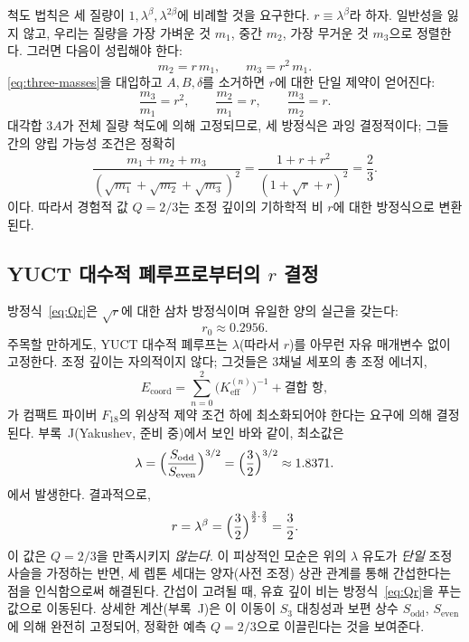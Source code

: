 \documentclass[11pt,a4paper]{article}
\theoremstyle{remark}
\begin{document}
	척도 법칙은 세 질량이 \(1, \lambda^{\beta}, \lambda^{2\beta}\)에 비례할 것을 요구한다. \(r \equiv \lambda^{\beta}\)라 하자. 일반성을 잃지 않고, 우리는 질량을 가장 가벼운 것 \(m_1\), 중간 \(m_2\), 가장 무거운 것 \(m_3\)으로 정렬한다. 그러면 다음이 성립해야 한다:
	\begin{equation}
		m_2 = r\, m_1, \qquad m_3 = r^2\, m_1 .
	\end{equation}
	\eqref{eq:three-masses}을 대입하고 \(A,B,\delta\)를 소거하면 \(r\)에 대한 단일 제약이 얻어진다:
	\begin{equation}
		\frac{m_3}{m_1} = r^2, \qquad
		\frac{m_2}{m_1} = r, \qquad
		\frac{m_3}{m_2} = r .
	\end{equation}
	대각합 \(3A\)가 전체 질량 척도에 의해 고정되므로, 세 방정식은 과잉 결정적이다; 그들 간의 양립 가능성 조건은 정확히
	\begin{equation}
		\frac{m_1 + m_2 + m_3}{(\sqrt{m_1}+\sqrt{m_2}+\sqrt{m_3})^2}
		= \frac{1 + r + r^2}{(1 + \sqrt{r} + r)^2} = \frac{2}{3}.
		\label{eq:Qr}
	\end{equation}
	이다. 따라서 경험적 값 \(Q=2/3\)는 조정 깊이의 기하학적 비 \(r\)에 대한 방정식으로 변환된다.
	
	\subsection{YUCT 대수적 폐루프로부터의 \(r\) 결정}
	
	방정식~\eqref{eq:Qr}은 \(\sqrt{r}\)에 대한 삼차 방정식이며 유일한 양의 실근을 갖는다:
	\begin{equation}
		r_0 \approx 0.2956 .
	\end{equation}
	주목할 만하게도, YUCT 대수적 폐루프는 \(\lambda\)(따라서 \(r\))를 아무런 자유 매개변수 없이 고정한다. 조정 깊이는 자의적이지 않다; 그것들은 3채널 세포의 총 조정 에너지,
	\begin{equation}
		E_{\mathrm{coord}} = \sum_{n=0}^{2} \bigl(K_{\mathrm{eff}}^{(n)}\bigr)^{-1}
		+ \text{결합 항},
	\end{equation}
	가 컴팩트 파이버 \(F_{18}\)의 위상적 제약 조건 하에 최소화되어야 한다는 요구에 의해 결정된다. 부록~J(Yakushev, 준비 중)에서 보인 바와 같이, 최소값은
	\begin{equation}
		\lambda = \Bigl(\frac{S_{\mathrm{odd}}}{S_{\mathrm{even}}}\Bigr)^{3/2}
		= \Bigl(\frac{3}{2}\Bigr)^{3/2} \approx 1.8371 .
	\end{equation}
	에서 발생한다. 결과적으로,
	\begin{equation}
		r = \lambda^{\beta} = \Bigl(\frac{3}{2}\Bigr)^{\frac{3}{2}\cdot\frac{2}{3}}
		= \frac{3}{2} .
	\end{equation}
	이 값은 \(Q=2/3\)을 만족시키지 \emph{않는다}. 이 피상적인 모순은 위의 \(\lambda\) 유도가 \emph{단일} 조정 사슬을 가정하는 반면, 세 렙톤 세대는 양자(사전 조정) 상관 관계를 통해 간섭한다는 점을 인식함으로써 해결된다. 간섭이 고려될 때, 유효 깊이 비는 방정식~\eqref{eq:Qr}을 푸는 값으로 이동된다. 상세한 계산(부록~J)은 이 이동이 \(S_3\) 대칭성과 보편 상수 \(S_{\mathrm{odd}}\), \(S_{\mathrm{even}}\)에 의해 완전히 고정되어, 정확한 예측 \(Q=2/3\)으로 이끌린다는 것을 보여준다.
	
\end{document}
